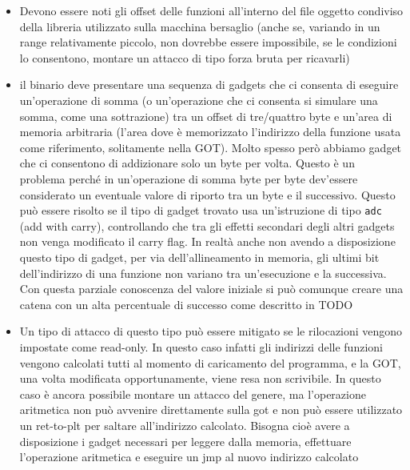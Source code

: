 \begin{itemize}

  \item Devono essere noti gli offset delle funzioni all'interno del
    file oggetto condiviso della libreria utilizzato sulla macchina
    bersaglio (anche se, variando in un range relativamente piccolo,
    non dovrebbe essere impossibile, se le condizioni lo consentono,
    montare un attacco di tipo forza bruta per ricavarli)

  \item il binario deve presentare una sequenza di gadgets che ci
    consenta di eseguire un'operazione di somma (o un'operazione che
    ci consenta si simulare una somma, come una sottrazione) tra un
    offset di tre/quattro byte e un'area di memoria arbitraria (l'area
    dove è memorizzato l'indirizzo della funzione usata come
    riferimento, solitamente nella GOT). Molto spesso però abbiamo
    gadget che ci consentono di addizionare solo un byte per
    volta. Questo è un problema perché in un'operazione di somma byte
    per byte dev'essere considerato un eventuale valore di riporto tra
    un byte e il successivo. Questo può essere risolto se il tipo di
    gadget trovato usa un'istruzione di tipo \lstinline{adc} (add with
    carry), controllando che tra gli effetti secondari degli altri
    gadgets non venga modificato il carry flag. In realtà anche non
    avendo a disposizione questo tipo di gadget, per via
    dell'allineamento in memoria, gli ultimi bit dell'indirizzo di una
    funzione non variano tra un'esecuzione e la successiva. Con
    questa parziale conoscenza del valore iniziale si può comunque
    creare una catena con un alta percentuale di successo come
    descritto in TODO

  \item Un tipo di attacco di questo tipo può essere mitigato se le
    rilocazioni vengono impostate come read-only. In questo caso
    infatti gli indirizzi delle funzioni vengono calcolati tutti al
    momento di caricamento del programma, e la GOT, una volta
    modificata opportunamente, viene resa non scrivibile. In questo
    caso è ancora possibile montare un attacco del genere, ma
    l'operazione aritmetica non può avvenire direttamente sulla got e
    non può essere utilizzato un ret-to-plt per saltare all'indirizzo
    calcolato. Bisogna cioè avere a disposizione i gadget necessari
    per leggere dalla memoria, effettuare l'operazione aritmetica e
    eseguire un jmp al nuovo indirizzo calcolato

\end{itemize}


